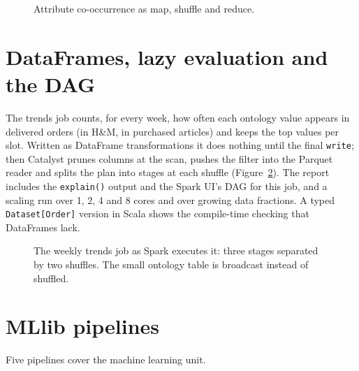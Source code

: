 \begin{figure}[h]
\centering
\caption{Attribute co-occurrence as map, shuffle and reduce.}\label{fig:mr}
\end{figure}

\section{DataFrames, lazy evaluation and the DAG}

The trends job counts, for every week, how often each ontology value appears in delivered orders (in H\&M, in purchased articles) and keeps the top values per slot. Written as DataFrame transformations it does nothing until the final \texttt{write}; then Catalyst prunes columns at the scan, pushes the filter into the Parquet reader and splits the plan into stages at each shuffle (Figure~\ref{fig:dag}). The report includes the \texttt{explain()} output and the Spark UI's DAG for this job, and a scaling run over 1, 2, 4 and 8 cores and over growing data fractions. A typed \texttt{Dataset[Order]} version in Scala shows the compile-time checking that DataFrames lack.

\begin{figure}[h]
\centering
\caption{The weekly trends job as Spark executes it: three stages separated by two shuffles. The small ontology table is broadcast instead of shuffled.}\label{fig:dag}
\end{figure}

\section{MLlib pipelines}

Five pipelines cover the machine learning unit.

